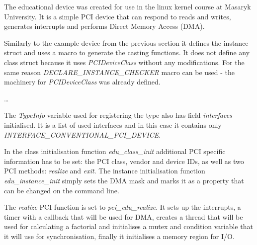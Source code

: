 
The educational device was created for use in the linux kernel course at
Masaryk University. It is a simple PCI device that can respond to reads and
writes, generates interrupts and performs Direct Memory Access (DMA).

Similarly to the example device from the previous section it defines the
instance struct and uses a macro to generate the casting functions. It does not
define any class struct because it uses \emph{PCIDeviceClass} without any
modifications. For the same reason \emph{DECLARE\_INSTANCE\_CHECKER} macro can
be used - the machinery for \emph{PCIDeviceClass} was already defined. 

\begin{codeblock}
    
    \dots
    
\end{codeblock}

The \emph{TypeInfo} variable used for registering the type also has field
\emph{interfaces} initialised. It is a list of used interfaces and in this case
it contains only \emph{INTERFACE\_CONVENTIONAL\_PCI\_DEVICE}.

\begin{codeblock}
    
\end{codeblock}

In the class initialisation function \emph{edu\_class\_init} additional PCI
specific information has to be set: the PCI class, vendor and device IDs, as
well as two PCI methods: \emph{realize} and \emph{exit}. The instance
initialisation function \emph{edu\_instance\_init} simply sets the DMA mask and
marks it as a property that can be changed on the command line.

\begin{codeblock}
    
\end{codeblock}

The \emph{realize} PCI function is set to \emph{pci\_edu\_realize}. It sets up
the interrupts, a timer with a callback that will be used for DMA, creates
a thread that will be used for calculating a factorial and initialises a mutex
and condition variable that it will use for synchronisation, finally it
initialises a memory region for I/O.

